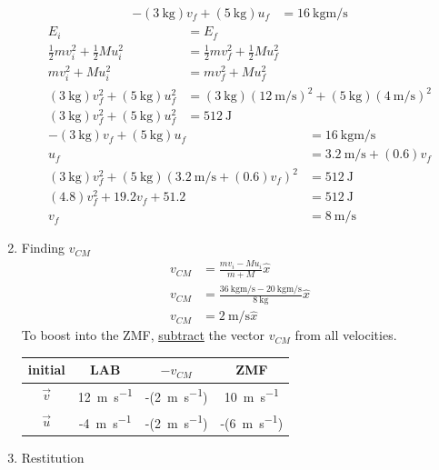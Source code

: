 \documentclass{article}
\begin{document}
\begin{enumerate}[label = \textbf{\arabic*)}]
\begin{align*}
			-(\SI{3}{\kilogram})v_f + (\SI{5}{\kilogram})u_f & = \SI{16}{\kilogram \meter \per \second}
		\end{align*}
		\begin{align*}
			E_i & = E_f \\
			\frac{1}{2}mv_i^2 + \frac{1}{2}Mu_i^2 & = \frac{1}{2}mv_f^2 + \frac{1}{2}Mu_f^2 \\
			mv_i^2 + Mu_i^2 & = mv_f^2 + Mu_f^2 \\
			(\SI{3}{\kilogram})v_f^2 + (\SI{5}{\kilogram})u_f^2 & = (\SI{3}{\kilogram})(\SI{12}{\meter \per \second})^2 + (\SI{5}{\kilogram})(\SI{4}{\meter \per \second})^2 \\
			(\SI{3}{\kilogram})v_f^2 + (\SI{5}{\kilogram})u_f^2 & = \SI{512}{\joule}
		\end{align*}
		\begin{align*}
			-(\SI{3}{\kilogram})v_f + (\SI{5}{\kilogram})u_f & = \SI{16}{\kilogram \meter \per \second} \\
			u_f & = \SI{3.2}{\meter \per \second} + (0.6)v_f \\
			(\SI{3}{\kilogram})v_f^2 + (\SI{5}{\kilogram})(\SI{3.2}{\meter \per \second} + (0.6)v_f)^2 & = \SI{512}{\joule} \\
			(4.8)v_f^2 + 19.2v_f + 51.2 & = \SI{512}{\joule} \\
			v_f & = \SI{8}{\meter \per \second}
		\end{align*}
	\item Finding $ v_{CM} $
		\begin{align*}
			v_{CM} & = \frac{mv_i - Mu_i}{m + M} \hat{x} \\
			v_{CM} & = \frac{\SI{36}{\kilogram \meter \per \second} - \SI{20}{\kilogram \meter \per \second}}{\SI{8}{\kilogram}} \hat{x} \\
			v_{CM} & = \SI{2}{\meter \per \second} \hat{x}
		\end{align*}
		To boost into the ZMF, \underline{subtract} the vector $ v_{CM} $ from all velocities.
		\begin{tabular}{| c | c | c | c |}
			\hline
			initial & LAB & $ -v_{CM} $ & ZMF \\
			\hline
			$ \vec{v} $ & \SI{12}{\meter \per \second} & -(\SI{2}{\meter \per \second}) & \SI{10}{\meter \per \second} \\
			\hline
			$ \vec{u} $ & -\SI{4}{\meter \per \second} & -(\SI{2}{\meter \per \second}) & -(\SI{6}{\meter \per \second}) \\
			\hline
		\end{tabular}
	\item Restitution

\end{enumerate}
\end{document}
